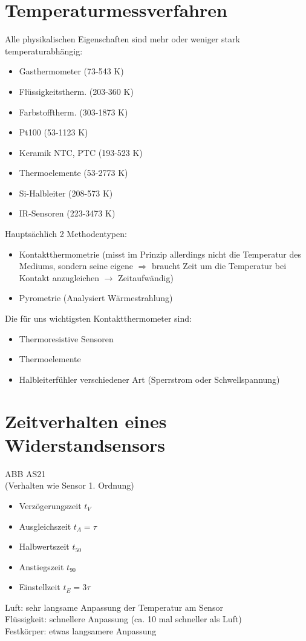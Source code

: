 \section{Temperaturmessverfahren}
Alle physikalischen Eigenschaften sind mehr oder weniger stark temperaturabhängig:
\begin{itemize}
\item Gasthermometer (73-543 K)
\item Flüssigkeitstherm. (203-360 K)
\item Farbstofftherm. (303-1873 K)
\item Pt100 (53-1123 K)
\item Keramik NTC, PTC (193-523 K)
\item Thermoelemente (53-2773 K)
\item Si-Halbleiter (208-573 K)
\item IR-Sensoren (223-3473 K)
\end{itemize}
Hauptsächlich 2 Methodentypen:
\begin{itemize}
\item Kontaktthermometrie (misst im Prinzip allerdings nicht die Temperatur des Mediums, sondern seine eigene $\Rightarrow$ braucht Zeit um die Temperatur bei Kontakt anzugleichen $\to$ Zeitaufwändig)
\item Pyrometrie (Analysiert Wärmestrahlung)
\end{itemize}
Die für uns wichtigsten Kontaktthermometer sind:
\begin{itemize}
\item Thermoresistive Sensoren
\item Thermoelemente
\item Halbleiterfühler verschiedener Art (Sperrstrom oder Schwellspannung)
\end{itemize}
\section{Zeitverhalten eines Widerstandsensors}
ABB AS21\\
(Verhalten wie Sensor 1. Ordnung)
\begin{itemize}
\item Verzögerungszeit $t_V$
\item Ausgleichszeit $t_A = \tau$
\item Halbwertszeit $t_{50}$
\item Anstiegszeit $t_{90}$
\item Einstellzeit $t_E=3 \tau$
\end{itemize}
Luft: sehr langsame Anpassung der Temperatur am Sensor\\
Flüssigkeit: schnellere Anpassung (ca. 10 mal schneller als Luft)\\
Festkörper: etwas langsamere Anpassung

